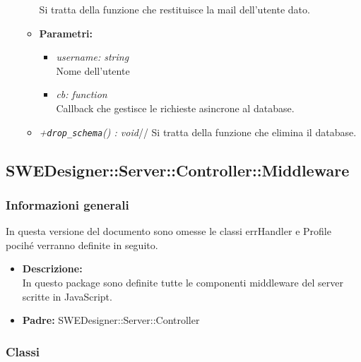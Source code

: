 \begin{itemize}
\begin{itemize}
            Si tratta della funzione che restituisce la mail dell'utente dato.\\
            \item \textbf{Parametri: }\\
            \begin{itemize}
              \item \emph{username: string}\\
              Nome dell'utente
              \item \emph{cb: function}\\
              Callback che gestisce le richieste asincrone al database.
            \end{itemize}
            \item \emph{+\texttt{drop\_schema}() : void}//
            Si tratta della funzione che elimina il database.
          \end{itemize}
        \end{itemize}
  \subsection{SWEDesigner::Server::Controller::Middleware}
    \subsubsection{Informazioni generali}
      In questa versione del documento sono omesse le classi errHandler e Profile pocihé verranno definite in seguito.
      \begin{itemize}
        \item \textbf{Descrizione: }\\
        In questo package sono definite tutte le componenti middleware del server scritte in JavaScript.
        \item \textbf{Padre: }SWEDesigner::Server::Controller
      \end{itemize}
    \subsubsection{Classi}
